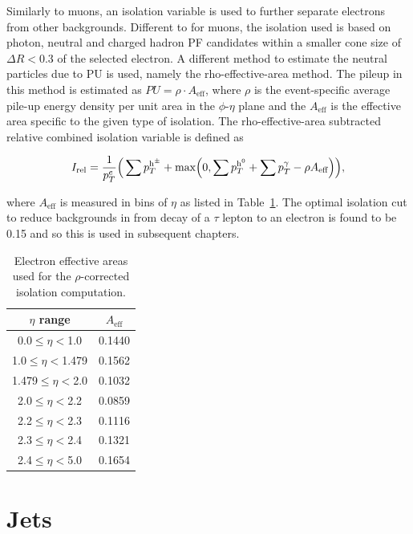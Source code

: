 Similarly to muons, an isolation variable is used to further separate electrons from other backgrounds.
Different to for muons, the isolation used is based on photon, neutral and charged hadron \ac{PF} candidates within a smaller cone size of $\Delta R<0.3$ of the selected electron.
A different method to estimate the neutral particles due to \ac{PU} is used, namely the rho-effective-area method. 
The pileup in this method is estimated as $PU=\rho\cdot A_{\text{eff}}$, where $\rho$ is the event-specific average pile-up energy density per unit area in the $\phi$-$\eta$ plane and the $A_{\text{eff}}$ is the effective area specific to the given type of isolation. 
The rho-effective-area subtracted relative combined isolation variable is defined as

\begin{equation}
\label{eqn:electron_reliso_rho}
I_{\text{rel}} = \frac{1}{p_{T}^{e}} \Big( \sum p_{T}^{\text{h}^{\pm}} + \text{max}\Big( 0, \sum p_{T}^{\text{h}^0} + \sum p_{T}^{\gamma} - \rho A_{\text{eff}} \Big) \Big),
\end{equation}

where $A_{\text{eff}}$ is measured in bins of $\eta$ as listed in Table~\ref{tab:EleEA}.
The optimal isolation cut to reduce backgrounds in from decay of a $\tau$ lepton to an electron is found to be 0.15 and so this is used in subsequent chapters.

\begin{table}[htb]
\begin{center}
\begin{tabular}{|c|c|}
\hline
$\eta$ range & $A_{\text{eff}}$ \\
\hline
\hline
0.0$\leq\eta<$1.0   &  0.1440 \\
1.0$\leq\eta<$1.479 &  0.1562 \\
1.479$\leq\eta<$2.0 &  0.1032 \\
2.0$\leq\eta<$2.2   &  0.0859 \\
2.2$\leq\eta<$2.3   &  0.1116 \\
2.3$\leq\eta<$2.4   &  0.1321 \\
2.4$\leq\eta<$5.0   &  0.1654 \\
\hline
\end{tabular}
\end{center}
\caption{
 Electron effective areas used for the $\rho$-corrected isolation computation.
}
\label{tab:EleEA}
\end{table}

\section{Jets}

